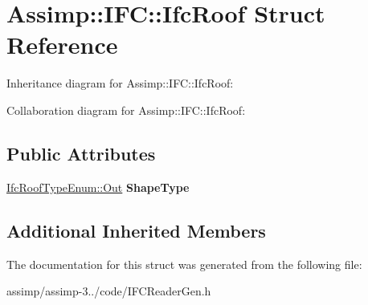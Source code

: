 \hypertarget{struct_assimp_1_1_i_f_c_1_1_ifc_roof}{\section{Assimp\+:\+:I\+F\+C\+:\+:Ifc\+Roof Struct Reference}
\label{struct_assimp_1_1_i_f_c_1_1_ifc_roof}
}


Inheritance diagram for Assimp\+:\+:I\+F\+C\+:\+:Ifc\+Roof\+:


Collaboration diagram for Assimp\+:\+:I\+F\+C\+:\+:Ifc\+Roof\+:
\subsection*{Public Attributes}
\begin{DoxyCompactItemize}
\item 
\hypertarget{struct_assimp_1_1_i_f_c_1_1_ifc_roof_a94ba0ce2ad54620f4f0804bb205d2c1b}{\hyperlink{classboost_1_1shared__ptr}{Ifc\+Roof\+Type\+Enum\+::\+Out} {\bfseries Shape\+Type}}\label{struct_assimp_1_1_i_f_c_1_1_ifc_roof_a94ba0ce2ad54620f4f0804bb205d2c1b}

\end{DoxyCompactItemize}
\subsection*{Additional Inherited Members}


The documentation for this struct was generated from the following file\+:\begin{DoxyCompactItemize}
\item 
assimp/assimp-\/3../code/I\+F\+C\+Reader\+Gen.\+h\end{DoxyCompactItemize}
